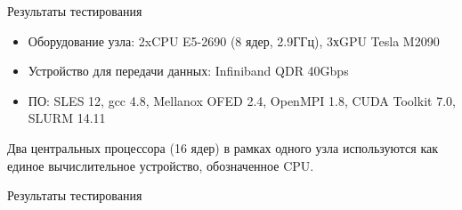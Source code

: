 \documentclass{beamer}
\begin{document}
\begin{frame}{Результаты тестирования}
	\begin{itemize}
		\item Оборудование узла: 2xCPU E5-2690 (8 ядер, 2.9ГГц), 3хGPU Tesla M2090 
		
		\vspace{0.7cm}		
		
		\item Устройство для передачи данных: Infiniband QDR 40Gbps

		\vspace{0.7cm}

		\item ПО: SLES 12, gcc 4.8,  Mellanox OFED 2.4, OpenMPI 1.8, CUDA Toolkit 7.0, SLURM 14.11 

	\end{itemize}
	
	\vspace{0.7cm}
	
Два центральных процессора (16 ядер) в рамках одного узла используются как единое вычислительное устройство, обозначенное CPU.
\end{frame}


\begin{frame}{Результаты тестирования}
\end{frame}
\end{document}
